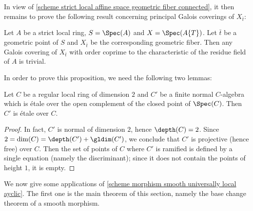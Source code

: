 In view of \cref{scheme strict local affine space geometric fiber connected}, it then remains to prove the following result concerning principal Galois coverings of $X_{\bar{t}}$:

\begin{proposition}\label{scheme strict local Galois covering trivial if oder prime}
Let $A$ be a strict local ring, $S=\Spec(A)$ and $X=\Spec(A\{T\})$. Let $\bar{t}$ be a geometric point of $S$ and $X_{\bar{t}}$ be the corresponding geometric fiber. Then any Galois covering of $X_{\bar{t}}$ with order coprime to the characteristic of the residue field of $A$ is trivial.
\end{proposition}

In order to prove this proposition, we need the following two lemmas:

\begin{lemma}
Let $C$ be a regular local ring of dimension $2$ and $C'$ be a finite normal $C$-algebra which is \'etale over the open complement of the closed point of $\Spec(C)$. Then $C'$ is \'etale over $C$.
\end{lemma}
\begin{proof}
In fact, $C'$ is normal of dimension $2$, hence $\depth(C)=2$. Since $2=\dim(C)=\depth(C')+\gldim(C')$, we conclude that $C'$ is projective (hence free) over $C$. Then the set of points of $C$ where $C'$ is ramified is defined by a single equation (namely the discriminant); since it does not contain the points of height $1$, it is empty.
\end{proof}

We now give some applications of \cref{scheme morphism smooth universally local ayclic}. The first one is the main theorem of this section, namely the base change theorem of a smooth morphism.

